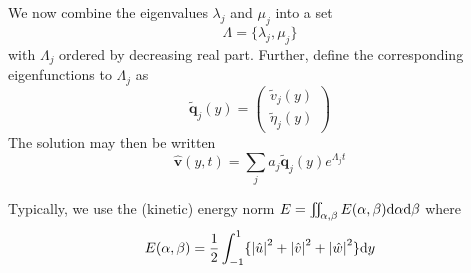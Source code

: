 \documentclass{jknotes}
\begin{document}
We now combine the eigenvalues $\lambda_j$ and $\mu_j$ into a set
\begin{equation}
	\Lambda = \{ \lambda_j, \mu_j\}
\end{equation}
with $\Lambda_j$ ordered by decreasing real part. Further, define the
corresponding eigenfunctions to $\Lambda_j$ as
\begin{equation}
	\symbf{\tilde{q}}_j(y) = \begin{pmatrix} \tilde{v}_j(y) \\
	\tilde{\eta}_j(y) \end{pmatrix}
\end{equation}
The solution may then be written
\begin{equation}
	\hat{\symbf{v}}(y,t) = \sum_j a_j \symbf{\tilde{q}}_j(y) e^{\Lambda_j t}
	\label{eq:l11:4}
\end{equation}

Typically, we use the (kinetic) energy norm $E = \iint_{\alpha,\beta}
E(\alpha, \beta) \diffd \alpha \diffd \beta$ where
\begin{equation}
	E(\alpha,\beta) = \frac{1}{2}\int_{-1}^1 \{ \abs{\hat{u}}^2 +
	\abs{\hat{v}}^2 + \abs{\hat{w}}^2 \} \diffd y
\end{equation}
\end{document}
